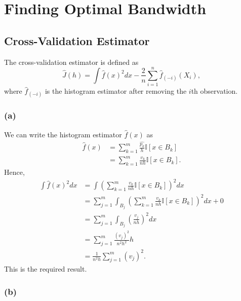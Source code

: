 \chapter{Finding Optimal Bandwidth}

\section{Cross-Validation Estimator}

The cross-validation estimator is defined as
\begin{equation*}
    \hat{J}(h) = \int \hat{f}(x)^2 dx - \frac{2}{n}\sum_{i=1}^{n}\hat{f}_{(-i)}
    (X_i), 
\end{equation*}
where $\hat{f}_{(-i)}$ is the histogram estimator after removing the $i$th
observation.

\subsection*{(a)}

We can write the histogram estimator $\hat{f}(x)$ as 
\begin{equation*}
  \begin{aligned}
    \hat{f}(x) &= \sum_{k=1}^{m}\frac{\hat{p_k}}{h}\mathbb{I}    [x\in B_k] \\
    &= \sum_{k=1}^{m}\frac{v_k}{nh}\mathbb{I}[x\in B_k].
  \end{aligned}
\end{equation*} 
Hence,
\begin{equation}
  \begin{aligned}
    \int\hat{f}(x)^2 dx &= \int \left(\sum_{k=1}^{m}\frac{v_k}{nh}\mathbb{I}[x\in
    B_k]\right)^2 dx \\
    &= \sum_{j=1}^{m} \int_{B_j}\left(\sum_{k=1}^{m}\frac{v_k}{nh}\mathbb{I}[x\in
    B_k]\right)^2 dx + 0 \\
    &= \sum_{j=1}^{m}\int_{B_j}\left(\frac{v_j}{nh}\right)^2 dx \\
    &= \sum_{j=1}^{m} \frac{(v_j)^2}{n^2 h^2}h \\
    &= \frac{1}{n^2 h}\sum_{j=1}^{m}(v_j)^2.
  \end{aligned}
  \label{eq1.1}
\end{equation}
This is the required result.

\subsection*{(b)}

